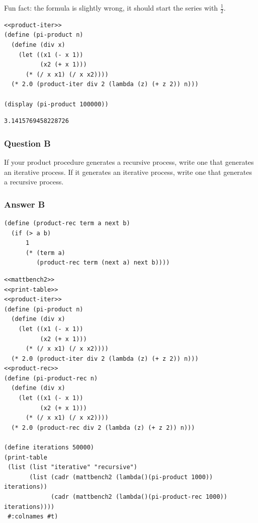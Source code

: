 \documentclass[final,fleqn,titlepage,twoside]{article}
\begin{document}
Fun fact: the formula is slightly wrong, it should start the series with \(\frac{1}{2}\).
\begin{verbatim}
<<product-iter>>
(define (pi-product n)
  (define (div x)
    (let ((x1 (- x 1))
          (x2 (+ x 1)))
      (* (/ x x1) (/ x x2))))
  (* 2.0 (product-iter div 2 (lambda (z) (+ z 2)) n)))

(display (pi-product 100000))
\end{verbatim}

\begin{verbatim}
3.1415769458228726
\end{verbatim}

\subsubsection{Question B}
\label{sec:orgdb57b26}
If your product procedure generates a recursive process, write one that
generates an iterative process. If it generates an iterative process, write one
that generates a recursive process.

\subsubsection{Answer B}
\label{sec:org9d2bc50}
\begin{verbatim}
(define (product-rec term a next b)
  (if (> a b)
      1
      (* (term a)
         (product-rec term (next a) next b))))
\end{verbatim}

\begin{verbatim}
<<mattbench2>>
<<print-table>>
<<product-iter>>
(define (pi-product n)
  (define (div x)
    (let ((x1 (- x 1))
          (x2 (+ x 1)))
      (* (/ x x1) (/ x x2))))
  (* 2.0 (product-iter div 2 (lambda (z) (+ z 2)) n)))
<<product-rec>>
(define (pi-product-rec n)
  (define (div x)
    (let ((x1 (- x 1))
          (x2 (+ x 1)))
      (* (/ x x1) (/ x x2))))
  (* 2.0 (product-rec div 2 (lambda (z) (+ z 2)) n)))

(define iterations 50000)
(print-table
 (list (list "iterative" "recursive")
       (list (cadr (mattbench2 (lambda()(pi-product 1000)) iterations))
             (cadr (mattbench2 (lambda()(pi-product-rec 1000)) iterations))))
 #:colnames #t)
\end{verbatim}
\end{document}

